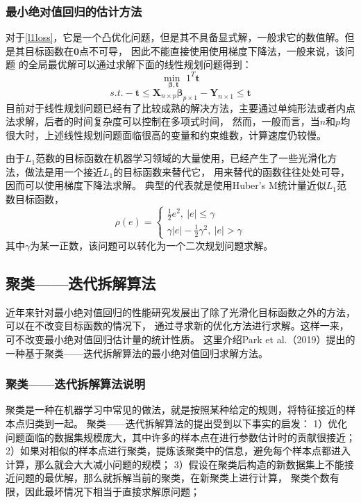 \subsubsection{最小绝对值回归的估计方法}
对于\eqref{l1loss}，它是一个凸优化问题，但是其不具备显式解，一般求它的数值解。但是其目标函数在$\bm{0}$点不可导，
因此不能直接使用使用梯度下降法，一般来说，该问题
的全局最优解可以通过求解下面的线性规划问题得到：
$$
    \underset{\bm{\beta}, \bm{t}}{\operatorname{min\ }} 1^T \bm{t}
$$
$$
    s.t. -\bm{t} \leq \bm{X}_{n\times p}\bm{\beta}_{p\times1} - \bm{Y}_{n\times 1} \leq \bm{t}
$$
目前对于线性规划问题已经有了比较成熟的解决方法，主要通过单纯形法或者内点法求解，后者的时间复杂度可以控制在多项式时间，
然而，一般而言，当$n$和$p$均很大时，上述线性规划问题面临很高的变量和约束维数，计算速度仍较慢。

由于$L_1$范数的目标函数在机器学习领域的大量使用，已经产生了一些光滑化方法，做法是用一个接近$L_1$的目标函数来替代它，
用来替代的函数往往处处可导，因而可以使用梯度下降法求解。
典型的代表就是使用Huber’s M统计量近似$L_1$范数目标函数\cite{lucas1997robustness}，
\begin{equation*}
    \rho(e) = \left\{
        \begin{array}{clr}
            \frac1{2}e^2,\ |e| \leq \gamma \\
            \gamma |e| - \frac1{2}\gamma ^2 ,\ |e| > \gamma
        \end{array}
    \right.
\end{equation*}
其中$\gamma$为某一正数，该问题可以转化为一个二次规划问题求解。

\subsection{聚类——迭代拆解算法}
近年来针对最小绝对值回归的性能研究发展出了除了光滑化目标函数之外的方法，可以在不改变目标函数的情况下，
通过寻求新的优化方法进行求解。这样一来，可不改变最小绝对值回归估计量的统计性质。
这里介绍Park et al.（2019）提出的一种基于聚类——迭代拆解算法的最小绝对值回归求解方法\cite{park2021optimization}。

\subsubsection{聚类——迭代拆解算法说明}
聚类是一种在机器学习中常见的做法，就是按照某种给定的规则，将特征接近的样本点归类到一起。
聚类——迭代拆解算法的提出受到以下事实的启发：
1）优化问题面临的数据集规模庞大，其中许多的样本点在进行参数估计时的贡献很接近；
2）如果对相似的样本点进行聚类，提炼该聚类中的信息，避免每个样本点都进入计算，那么就会大大减小问题的规模；
3）假设在聚类后构造的新数据集上不能接近问题的最优解，那么就拆解当前的聚类，在新聚类上进行计算，
聚类个数有限，因此最坏情况下相当于直接求解原问题；


